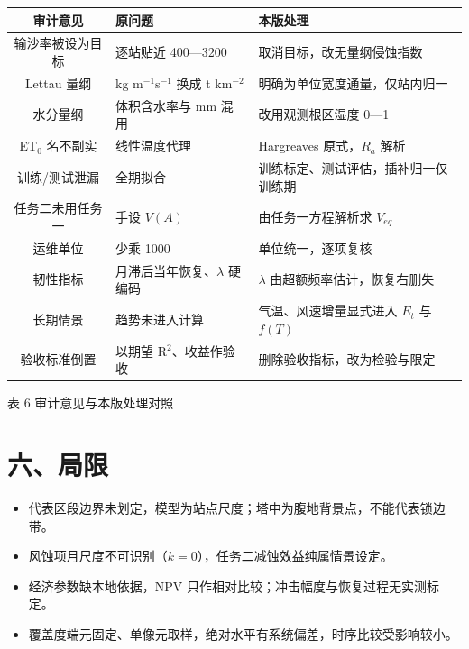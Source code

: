 \documentclass[11pt,a4paper]{ctexart}
\begin{document}
\begin{table}[H]\centering\footnotesize\setlength{\parskip}{1pt}
\begin{tabularx}{\textwidth}{|c|X|X|}
\toprule
审计意见 & 原问题 & 本版处理\\
\midrule
输沙率被设为目标 & 逐站贴近 400—3200 & 取消目标，改无量纲侵蚀指数\\
Lettau 量纲 & kg m$^{-1}$s$^{-1}$ 换成 t km$^{-2}$ & 明确为单位宽度通量，仅站内归一\\
水分量纲 & 体积含水率与 mm 混用 & 改用观测根区湿度 0—1\\
ET$_0$ 名不副实 & 线性温度代理 & Hargreaves 原式，$R_a$ 解析\\
训练/测试泄漏 & 全期拟合 & 训练标定、测试评估，插补归一仅训练期\\
任务二未用任务一 & 手设 $V(A)$ & 由任务一方程解析求 $V_{eq}$\\
运维单位 & 少乘 1000 & 单位统一，逐项复核\\
韧性指标 & 月滞后当年恢复、$\lambda$ 硬编码 & $\lambda$ 由超额频率估计，恢复右删失\\
长期情景 & 趋势未进入计算 & 气温、风速增量显式进入 $E_t$ 与 $f(T)$\\
验收标准倒置 & 以期望 R$^2$、收益作验收 & 删除验收指标，改为检验与限定\\
\bottomrule
\end{tabularx}
\begin{center}\small 表 6  审计意见与本版处理对照\end{center}
\end{table}
\section*{六、局限}
\begin{itemize}
\item 代表区段边界未划定，模型为站点尺度；塔中为腹地背景点，不能代表锁边带。
\item 风蚀项月尺度不可识别（$k=0$），任务二减蚀效益纯属情景设定。
\item 经济参数缺本地依据，NPV 只作相对比较；冲击幅度与恢复过程无实测标定。
\item 覆盖度端元固定、单像元取样，绝对水平有系统偏差，时序比较受影响较小。
\end{itemize}
\end{document}
